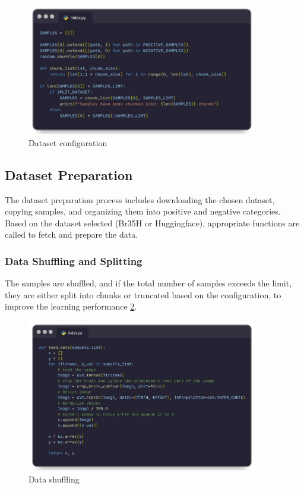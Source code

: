 \begin{figure}
    \centering
    \includegraphics[width=0.90\textwidth]{Img/Chap-01/18.jpg}
    \caption{Dataset configuration}
    \label{fig:brain_tumor_data_conf}
\end{figure}

\subsection{Dataset Preparation}

The dataset preparation process includes downloading the chosen dataset, copying samples, and organizing them into positive and negative categories. Based on the dataset selected (Br35H or Huggingface), appropriate functions are called to fetch and prepare the data.

\subsubsection{Data Shuffling and Splitting}

The samples are shuffled, and if the total number of samples exceeds the limit, they are either split into chunks or truncated based on the configuration, to improve the learning performance \ref{fig:brain_tumor_data_suffiling}.

\begin{figure}
    \centering
    \includegraphics[width=0.90\textwidth]{Img/Chap-01/19.jpg}
    \caption{ Data shuffling}
    \label{fig:brain_tumor_data_suffiling}
\end{figure}

